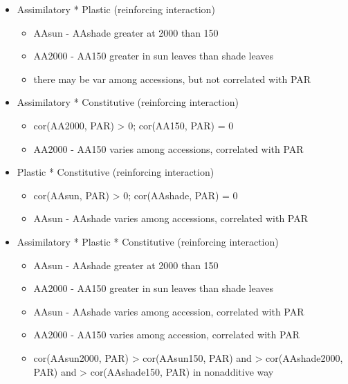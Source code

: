\documentclass[
  letterpaper,
  DIV=11,
  numbers=noendperiod]{scrartcl}
\providecommand{\tightlist}{%
  \setlength{\itemsep}{0pt}\setlength{\parskip}{0pt}}\usepackage{longtable,booktabs,array}
\begin{document}
\begin{itemize}
\tightlist
\item
  Assimilatory * Plastic (reinforcing interaction)

  \begin{itemize}
  \tightlist
  \item
    AAsun - AAshade greater at 2000 than 150
  \item
    AA2000 - AA150 greater in sun leaves than shade leaves
  \item
    there may be var among accessions, but not correlated with PAR
  \end{itemize}
\item
  Assimilatory * Constitutive (reinforcing interaction)

  \begin{itemize}
  \tightlist
  \item
    cor(AA2000, PAR) \textgreater{} 0; cor(AA150, PAR) = 0
  \item
    AA2000 - AA150 varies among accessions, correlated with PAR
  \end{itemize}
\item
  Plastic * Constitutive (reinforcing interaction)

  \begin{itemize}
  \tightlist
  \item
    cor(AAsun, PAR) \textgreater{} 0; cor(AAshade, PAR) = 0
  \item
    AAsun - AAshade varies among accessions, correlated with PAR
  \end{itemize}
\item
  Assimilatory * Plastic * Constitutive (reinforcing interaction)

  \begin{itemize}
  \tightlist
  \item
    AAsun - AAshade greater at 2000 than 150
  \item
    AA2000 - AA150 greater in sun leaves than shade leaves
  \item
    AAsun - AAshade varies among accession, correlated with PAR
  \item
    AA2000 - AA150 varies among accession, correlated with PAR
  \item
    cor(AAsun2000, PAR) \textgreater{} cor(AAsun150, PAR) and
    \textgreater{} cor(AAshade2000, PAR) and \textgreater{}
    cor(AAshade150, PAR) in nonadditive way
  \end{itemize}
\end{itemize}
\end{document}
